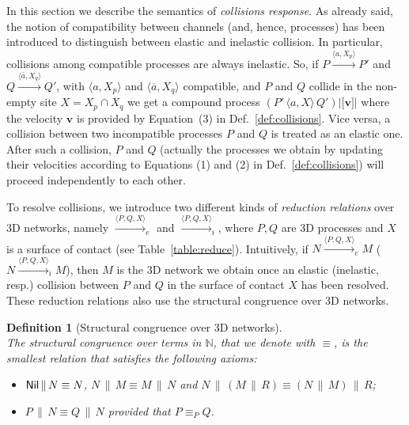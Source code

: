 \documentclass[11pt]{article}
\newcommand{\lsbrace}{\ensuremath{|\![}}
\newcommand{\rsbrace}{\ensuremath{]\!|}}
\newcommand{\vect}[1]{\mathbf{#1}}
\newcommand{\ch}[2]{\ensuremath{\langle #1, #2 \rangle}}
\newcommand{\NIL}{{\sf Nil}}
\newcommand{\unionc}[1]{\,\langle #1 \rangle\,}
\newcommand{\nar}[1]{\xrightarrow{#1}}
\newcommand{\enar}[1]{\xrightarrow{#1}_{e}}
\newcommand{\inar}[1]{\xrightarrow{#1}_{i}}
\newcommand{\nets}{{\mathbb N}}
\newtheorem{definition}{Definition}
\begin{document}
In this section we describe the semantics of {\em collisions response}. As already said, the notion of compatibility between channels (and, hence, processes) has been introduced to distinguish between elastic and inelastic collision. In particular, collisions among compatible processes are always inelastic. So, if $P\nar{\ch{a}{X_p}} P'$ and $Q \nar{\ch{\overline{a}}{X_q}} Q'$, with $\langle a, X_p\rangle$ and $\langle \overline{a}, X_q\rangle$ compatible, and $P$ and $Q$ collide in the non-empty site $X = X_p \cap X_q$ we get a compound process $(P' \unionc{a, X} Q') \lsbrace \vect{v} \rsbrace $ where the velocity $\vect{v}$ is  provided by Equation~(3) in Def.~\ref{def:collisions}. Vice versa, a collision between two incompatible processes $P$ and $Q$ is treated as an elastic one. After such a collision, $P$ and $Q$ (actually the processes we obtain by updating their velocities according to Equations (1) and (2) in Def.~\ref{def:collisions}) will proceed independently to each other.

To resolve collisions, we introduce two different kinds of {\em reduction relations} over 3D
networks, namely $\enar{\langle P, Q, X \rangle}$ and $\inar{\langle P, Q, X \rangle}$, where $P, Q$ are 3D processes and $X$ is a surface of contact (see Table~\ref{table:reduce}). Intuitively, if $N \enar{\langle P, Q, X \rangle} M$ ($N \inar{\langle P, Q, X \rangle} M$), then $M$ is the 3D network we obtain once an elastic (inelastic, resp.) collision between $P$ and $Q$ in the surface of contact $X$ has been resolved. These reduction relations also use the structural congruence over 3D networks.

\begin{definition}[Structural congruence over 3D networks]\label{def:congruencenets}
\ \\ The structural congruence over terms in $\nets $, that we denote with $\equiv$, is the
smallest relation that satisfies the following axioms:

\begin{itemize}
\item [-] $\NIL \,\|\, N \equiv N$,  $N \,\|\, M \equiv M \,\|\, N$ and $N
\,\|\, (M \,\|\, R)
\equiv (N \,\|\, M)  \,\|\, R$;

\item [-] $P \,\|\, N \equiv Q \,\|\,N$ provided that $P \equiv_P Q$.
\end{itemize}
\end{definition}
\end{document}
